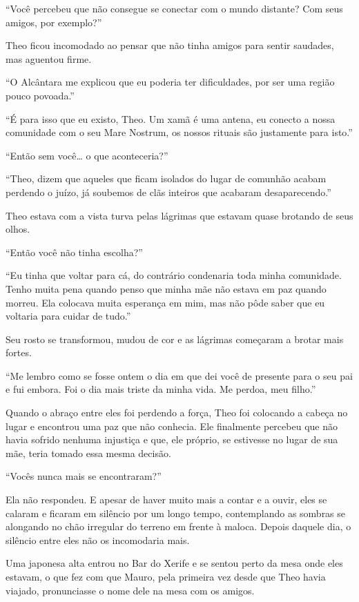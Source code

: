 ``Você percebeu que não consegue se conectar com o mundo distante? Com
seus amigos, por exemplo?''

Theo ficou incomodado ao pensar que não tinha amigos para sentir
saudades, mas aguentou firme.

``O Alcântara me explicou que eu poderia ter dificuldades, por ser uma
região pouco povoada.''

``É para isso que eu existo, Theo. Um xamã é uma antena, eu conecto a
nossa comunidade com o seu Mare Nostrum, os nossos rituais são
justamente para isto.''

``Então sem você\ldots{} o que aconteceria?''

``Theo, dizem que aqueles que ficam isolados do lugar de comunhão acabam
perdendo o juízo, já soubemos de clãs inteiros que acabaram
desaparecendo.''

Theo estava com a vista turva pelas lágrimas que estavam quase brotando
de seus olhos.

``Então você não tinha escolha?''

``Eu tinha que voltar para cá, do contrário condenaria toda minha
comunidade. Tenho muita pena quando penso que minha mãe não estava em
paz quando morreu. Ela colocava muita esperança em mim, mas não pôde
saber que eu voltaria para cuidar de tudo.''

Seu rosto se transformou, mudou de cor e as lágrimas começaram a brotar
mais fortes.

``Me lembro como se fosse ontem o dia em que dei você de presente para o
seu pai e fui embora. Foi o dia mais triste da minha vida. Me perdoa,
meu filho.''

Quando o abraço entre eles foi perdendo a força, Theo foi colocando a
cabeça no lugar e encontrou uma paz que não conhecia. Ele finalmente
percebeu que não havia sofrido nenhuma injustiça e que, ele próprio, se
estivesse no lugar de sua mãe, teria tomado essa mesma decisão.

``Vocês nunca mais se encontraram?''

Ela não respondeu. E apesar de haver muito mais a contar e a ouvir, eles
se calaram e ficaram em silêncio por um longo tempo, contemplando as
sombras se alongando no chão irregular do terreno em frente à maloca.
Depois daquele dia, o silêncio entre eles não os incomodaria mais.

\asterisc


Uma japonesa alta entrou no Bar do Xerife e se sentou perto da mesa onde
eles estavam, o que fez com que Mauro, pela primeira vez desde que Theo
havia viajado, pronunciasse o nome dele na mesa com os amigos.


